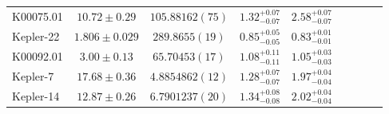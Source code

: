 \documentclass[a4paper,fleqn,usenatbib]{mnras}
\begin{document}
\begin{table*}
\begin{tabular}{lcccccccc}
K00075.01&	$10.72 \pm 0.29$   &$105.88162 (75)$     	&$1.32^{+0.07}_{-0.07}$	&$2.58^{+0.07}_{-0.07}$	\\
Kepler-22&	$1.806 \pm 0.029$  &$289.8655 (19)$      	&$0.85^{+0.05}_{-0.05}$	&$0.83^{+0.01}_{-0.01}$	\\
K00092.01&	$3.00 \pm 0.13$	    &$65.70453 (17)$      	&$1.08^{+0.11}_{-0.11}$	&$1.05^{+0.03}_{-0.03}$	\\
Kepler-7&	$17.68 \pm 0.36$	&$ 4.8854862 (12)$   	&$1.28^{+0.07}_{-0.07}$	&$1.97^{+0.04}_{-0.04}$	\\
Kepler-14&	$12.87 \pm 0.26$	&$ 6.7901237 (20)$  	&$1.34^{+0.08}_{-0.08}$	&$2.02^{+0.04}_{-0.04}$	\\
\end{tabular}
\end{table*}
\end{document}
